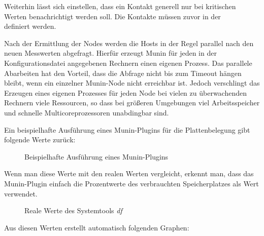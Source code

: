 Weiterhin lässt sich einstellen, dass ein Kontakt generell nur bei kritischen Werten benachrichtigt werden soll.
Die Kontakte müssen zuvor in der \\  definiert werden.

Nach der Ermittlung der Nodes werden die Hosts in der Regel parallel nach den neuen Messwerten abgefragt.
Hierfür erzeugt Munin  für jeden in der Konfigurationsdatei angegebenen Rechnern einen eigenen Prozess.
Das parallele Abarbeiten hat den Vorteil, dass die Abfrage nicht bis zum Timeout hängen bleibt, wenn ein einzelner Munin-Node nicht erreichbar ist.
Jedoch verschlingt das Erzeugen eines eigenen Prozesses für jeden Node bei vielen zu überwachenden Rechnern viele Ressourcen, so dass bei größeren Umgebungen viel Arbeitsspeicher und schnelle Multicoreprozessoren unabdingbar sind.

Ein beispielhafte Ausführung eines Munin-Plugins für die Plattenbelegung gibt folgende Werte zurück:

\begin{figure}[ht]
	\centering
		\caption{Beispielhafte Ausführung eines Munin-Plugins}
		\label{df-munin}
\end{figure}
\newpage
Wenn man diese Werte mit den realen Werten vergleicht, erkennt man, dass das Munin-Plugin einfach die Prozentwerte des verbrauchten Speicherplatzes als Wert verwendet.

\begin{figure}[ht]
	\centering
		\caption{Reale Werte des Systemtools \textit{df}}
		\label{df}
\end{figure}

Aus diesen Werten erstellt  automatisch folgenden Graphen:


